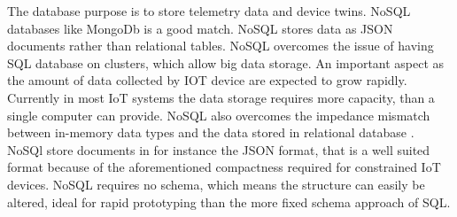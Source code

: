 The database purpose is to store telemetry data and device twins. NoSQL databases like MongoDb \cite{mongo} is a good match. NoSQL stores data as JSON documents rather than relational tables. NoSQL overcomes the issue of having SQL database on clusters, which allow big data storage. An important aspect as the amount of data collected by IOT device are expected to grow rapidly. Currently in most IoT systems the data storage requires more capacity, than a single computer can provide. NoSQL also overcomes the impedance mismatch between in-memory data types and the data stored in relational database \cite{nosql}. NoSQl store documents in for instance the JSON format, that is a well suited format because of the aforementioned compactness required for constrained IoT devices. NoSQL requires no schema, which means the structure can easily be altered, ideal for rapid prototyping than the more fixed schema approach of SQL.